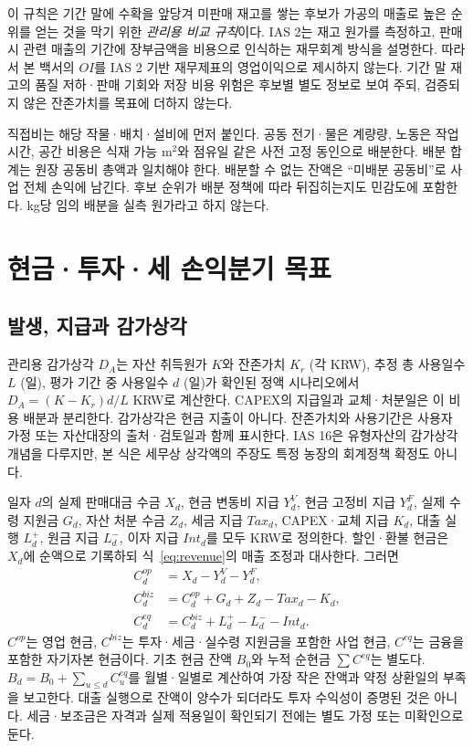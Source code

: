 \documentclass[11pt,a4paper]{article}
\begin{document}
이 규칙은 기간 말에 수확을 앞당겨 미판매 재고를 쌓는 후보가 가공의 매출로 높은 순위를 얻는 것을 막기 위한 \emph{관리용 비교 규칙}이다. IAS 2는 재고 원가를 측정하고, 판매 시 관련 매출의 기간에 장부금액을 비용으로 인식하는 재무회계 방식을 설명한다\cite{ias2}. 따라서 본 백서의 $OI$를 IAS 2 기반 재무제표의 영업이익으로 제시하지 않는다. 기간 말 재고의 품질 저하·판매 기회와 저장 비용 위험은 후보별 별도 정보로 보여 주되, 검증되지 않은 잔존가치를 목표에 더하지 않는다.

직접비는 해당 작물·배치·설비에 먼저 붙인다. 공동 전기·물은 계량량, 노동은 작업시간, 공간 비용은 식재 가능 m$^2$와 점유일 같은 사전 고정 동인으로 배분한다. 배분 합계는 원장 공동비 총액과 일치해야 한다. 배분할 수 없는 잔액은 ``미배분 공동비''로 사업 전체 손익에 남긴다. 후보 순위가 배분 정책에 따라 뒤집히는지도 민감도에 포함한다. kg당 임의 배분을 실측 원가라고 하지 않는다.

\section{현금·투자·세 손익분기 목표}
\subsection{발생, 지급과 감가상각}
관리용 감가상각 $D_A$는 자산 취득원가 $K$와 잔존가치 $K_r$ (각 KRW), 추정 총 사용일수 $L$ (일), 평가 기간 중 사용일수 $d$ (일)가 확인된 정액 시나리오에서 $D_A=(K-K_r)d/L$ KRW로 계산한다. CAPEX의 지급일과 교체·처분일은 이 비용 배분과 분리한다. 감가상각은 현금 지출이 아니다. 잔존가치와 사용기간은 사용자 가정 또는 자산대장의 출처·검토일과 함께 표시한다. IAS 16은 유형자산의 감가상각 개념을 다루지만, 본 식은 세무상 상각액의 주장도 특정 농장의 회계정책 확정도 아니다\cite{ias16}.

일자 $d$의 실제 판매대금 수금 $X_d$, 현금 변동비 지급 $Y_d^V$, 현금 고정비 지급 $Y_d^F$, 실제 수령 지원금 $G_d$, 자산 처분 수금 $Z_d$, 세금 지급 $Tax_d$, CAPEX·교체 지급 $K_d$, 대출 실행 $L_d^+$, 원금 지급 $L_d^-$, 이자 지급 $Int_d$를 모두 KRW로 정의한다. 할인·환불 현금은 $X_d$에 순액으로 기록하되 식~\eqref{eq:revenue}의 매출 조정과 대사한다. 그러면
\begin{align}
C_d^{op}&=X_d-Y_d^V-Y_d^F,\label{eq:opcash}\\
C_d^{biz}&=C_d^{op}+G_d+Z_d-Tax_d-K_d,\label{eq:bizcash}\\
C_d^{eq}&=C_d^{biz}+L_d^+-L_d^--Int_d.\label{eq:eqcash}
\end{align}
$C^{op}$는 영업 현금, $C^{biz}$는 투자·세금·실수령 지원금을 포함한 사업 현금, $C^{eq}$는 금융을 포함한 자기자본 현금이다. 기초 현금 잔액 $B_0$와 누적 순현금 $\sum C^{eq}$는 별도다. $B_d=B_0+\sum_{u\leq d}C_u^{eq}$를 월별·일별로 계산하여 가장 작은 잔액과 약정 상환일의 부족을 보고한다. 대출 실행으로 잔액이 양수가 되더라도 투자 수익성이 증명된 것은 아니다. 세금·보조금은 자격과 실제 적용일이 확인되기 전에는 별도 가정 또는 미확인으로 둔다.
\end{document}
